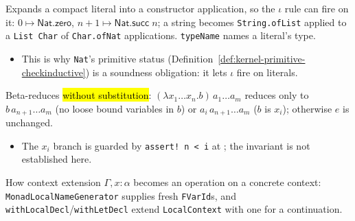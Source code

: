 \begin{definition}
\label{def:kernel-lit-to-ctor}
\leanok
{} Expands a compact literal into a constructor application, so the $\iota$ rule can
fire on it: $0 \mapsto \mathsf{Nat.zero}$, $n{+}1 \mapsto \mathsf{Nat.succ}\;n$; a string becomes
\texttt{String.ofList} applied to a \texttt{List Char} of \texttt{Char.ofNat} applications.
\texttt{typeName} names a literal's type.
\begin{itemize}
\item This is why \texttt{Nat}'s primitive status
(Definition~\ref{def:kernel-primitive-checkinductive}) is a soundness obligation: it lets $\iota$
fire on literals.
\end{itemize}
\end{definition}

\begin{definition}
\label{def:kernel-cheap-beta}
\leanok
{}

 Beta-reduces \hl{without substitution}: $(\lambda x_1\dots x_n.b)\,a_1\dots a_m$
reduces only to $b\,a_{n+1}\dots a_m$ (no loose bound variables in $b$) or $a_i\,a_{n+1}\dots a_m$
($b$ is $x_i$); otherwise $e$ is unchanged.
\begin{itemize}
\item {} The $x_i$ branch is guarded by \texttt{assert! n < i} at
; the invariant is not established here.
\end{itemize}
\end{definition}

\begin{definition}
\label{def:kernel-monad-localnamegen}
\leanok
{}

 How context extension $\Gamma, x{:}\alpha$ becomes an operation on a concrete
context: \texttt{MonadLocalNameGenerator} supplies fresh \texttt{FVarId}s, and
\texttt{withLocalDecl}/\texttt{withLetDecl} extend \texttt{LocalContext} with one for a
continuation.
\end{definition}

